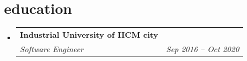 \documentclass[letterpaper,10pt]{article}
\makeatletter
\newcommand{\resumeSubheading}[4]{
  \vspace{-1pt}\item
    \begin{tabular*}{0.97\textwidth}[t]{l@{\extracolsep{\fill}}r}
      \vspace{5pt}
      \textbf{#1} & #2 \\
      \vspace{5pt}
      \textit{\small#3} & \textit{\small #4} \\
    \end{tabular*}\vspace{-5pt}
}
\newcommand{\resumeSubHeadingListStart}{\begin{itemize}[leftmargin=*]}
\newcommand{\resumeSubHeadingListEnd}{\end{itemize}}
\makeatother
\begin{document}
\section{education}\vspace{-4pt}
    \resumeSubHeadingListStart
        \resumeSubheading
            {Industrial University of HCM city}{}
            {Software Engineer}{Sep 2016 -- Oct 2020}
    \resumeSubHeadingListEnd


\end{document}

